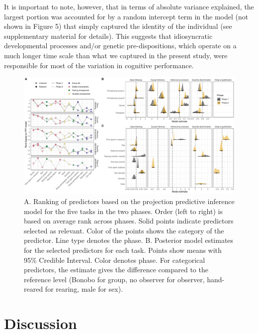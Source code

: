 \documentclass[
  man,floatsintext]{apa6}
\begin{document}
It is important to note, however, that in terms of absolute variance explained, the largest portion was accounted for by a random intercept term in the model (not shown in Figure 5) that simply captured the identity of the individual (see supplementary material for details). This suggests that idiosyncratic developmental processes and/or genetic pre-dispositions, which operate on a much longer time scale than what we captured in the present study, were responsible for most of the variation in cognitive performance.

\begin{figure}

{\centering \includegraphics[width=1\linewidth]{./figures/ppi3_i7} 

}

\caption{A. Ranking of predictors based on the projection predictive inference model for the five tasks in the two phases. Order (left to right) is based on average rank across phases. Solid points indicate predictors selected as relevant. Color of the points shows the category of the predictor. Line type denotes the phase. B. Posterior model estimates for the selected predictors for each task. Points show means with 95\% Credible Interval. Color denotes phase. For categorical predictors, the estimate gives the difference compared to the reference level (Bonobo for group, no observer for observer, hand-reared for rearing, male for sex).}\label{fig:ppiplot}
\end{figure}

\hypertarget{discussion}{%
\section{Discussion}\label{discussion}}
\end{document}
